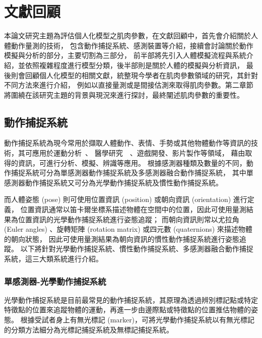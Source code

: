 \chapter{文獻回顧}
\fontsize{12pt}{18pt}\selectfont %

本論文研究主題為評估個人化模型之肌肉參數，在文獻回顧中，首先會介紹關於人體動作量測的技術，
包含動作捕捉系統、感測裝置等介紹，接續會討論關於動作模擬與分析的部分，主要切割為三部分，
前半部將先引入人體模擬流程與系統介紹，並依照複雜程度進行模型分類，後半部則是關於人體的模擬與分析資訊，
最後則會回顧個人化模型的相關文獻，統整現今學者在肌肉參數領域的研究，其針對不同方法來進行介紹，
例如以直接量測或是間接估測來取得肌肉參數。第二章節將圍繞在該研究主題的背景與現況來進行探討，最終闡述肌肉參數的重要性。

\section{動作捕捉系統}
動作捕捉系統為現今常用於擷取人體動作、表情、手勢或其他物體動作等資訊的技術，其可應用於運動分析~\cite{armitano2022swot}、
醫學研究~\cite{alarcon2020upper}~\cite{gu2023imu}、遊戲開發、影片製作等領域，
藉由取得的資訊，可進行分析、模擬、辨識等應用。
根據感測器種類及數量的不同，動作捕捉系統可分為單感測器動作捕捉系統及多感測器融合動作捕捉系統，
其中單感測器動作捕捉系統又可分為光學動作捕捉系統及慣性動作捕捉系統。 

而人體姿態 (pose) 則可使用位置資訊 (position) 或朝向資訊 (orientation) 進行定義，
位置資訊通常以笛卡爾坐標系描述物體在空間中的位置，因此可使用量測結果為位置資訊的光學動作捕捉系統進行姿態追蹤；
而朝向資訊則常以尤拉角 (Euler angles) 、旋轉矩陣 (rotation matrix) 或四元數 (quaternions) 來描述物體的朝向狀態，
因此可使用量測結果為朝向資訊的慣性動作捕捉系統進行姿態追蹤。
以下將針對光學動作捕捉系統、慣性動作捕捉系統、多感測器融合動作捕捉系統，這三大類系統進行介紹。

\subsection{單感測器-光學動作捕捉系統}
光學動作捕捉系統是目前最常見的動作捕捉系統，其原理為透過辨別標記點或特定特徵點的位置來追蹤物體的運動，再進一步由邊際點或特徵點的位置推估物體的姿態。
根據受試者身上有無光標記 (marker)，可將光學動作捕捉系統以有無光標記的分類方法細分為光標記捕捉系統及無標記捕捉系統。

